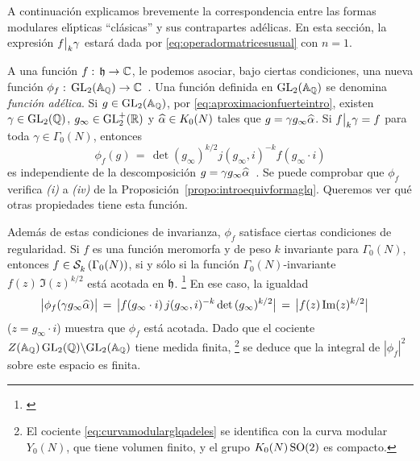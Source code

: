 A continuaci\'{o}n explicamos brevemente la correspondencia entre las formas
modulares el\'{\i}pticas ``cl\'{a}sicas'' y sus contrapartes ad\'{e}licas. En
esta secci\'{o}n, la expresi\'{o}n $f\big|_{k}{\gamma}$ estar\'{a}
dada por \eqref{eq:operadormatricesusual} con $n=1$.

A una funci\'{o}n $f:\,\mathfrak{h}\rightarrow\mathbb{C}$, le podemos asociar, bajo ciertas
condiciones, una nueva funci\'{o}n
\begin{math}
	\phi_{f}:\,\mathrm{GL}_{2}(\mathbb{A}_{\mathbb{Q}})\rightarrow\mathbb{C}
\end{math}~. Una funci\'{o}n definida en $\mathrm{GL}_{2}(\mathbb{A}_{\mathbb{Q}})$ se denomina
\emph{funci\'{o}n ad\'{e}lica}. Si $g\in\mathrm{GL}_{2}(\mathbb{A}_{\mathbb{Q}})$, por
\eqref{eq:aproximacionfuerteintro}, existen $\gamma\in\mathrm{GL}_{2}(\mathbb{Q})$,
$g_{\infty}\in\mathrm{GL}^{+}_{2}(\mathbb{R})$ y $\widehat{\alpha}\in K_{0}(N)$ tales que
$g=\gamma g_{\infty}\widehat{\alpha}$. Si $f\big|_{k}{\gamma}=f$ para
toda $\gamma\in\Gamma_{0}(N)$, entonces
\begin{equation}
	\label{eq:funcionadelicacorrespondientesobreq}
	\phi_{f}(g) \,=\, \det(g_{\infty})^{k/2}j(g_{\infty},i)^{-k}
		f(g_{\infty}\cdot i)
\end{equation}
%
es independiente de la descomposici\'{o}n
\begin{math}
	g=\gamma g_{\infty}\widehat{\alpha}
\end{math}~. Se puede comprobar que $\phi_f$ verifica \textit{(i)} a
\textit{(iv)} de la Proposici\'{o}n~\ref{propo:introequivformaglq}. Queremos
ver qu\'{e} otras propiedades tiene esta funci\'{o}n.

Adem\'{a}s de estas condiciones de invarianza, $\phi_{f}$ satisface ciertas
condiciones de regularidad. Si $f$ es una funci\'{o}n meromorfa y de peso $k$
invariante para $\Gamma_{0}(N)$, entonces $f\in\mathcal{S}^{}_{k}\left(\Gamma_{0}(N)\right)$, si y
s\'{o}lo si la funci\'{o}n $\Gamma_{0}(N)$-invariante $f(z)\,\Im(z)^{k/2}$
est\'{a} acotada en $\mathfrak{h}$.%
\footnote{
	\cite[Ch.~2, \S~1]{MiyakeModular}
}
En ese caso, la igualdad
\begin{align*}
	\big|\phi_{f}(\gamma g_{\infty}\widehat{\alpha})\big| & \,=\,
		\big|f(g_{\infty}\cdot i)\,j(g_{\infty},i)^{-k}\,
			\mathrm{det}\,(g_{\infty})^{k/2}\big|
		\,=\, \big|f(z)\,\mathrm{Im}(z)^{k/2}\big|
\end{align*}
%
($z=g_{\infty}\cdot i$) muestra que $\phi_{f}$ est\'{a} acotada.
Dado que el cociente
\begin{math}
	Z(\mathbb{A}_{\mathbb{Q}})\,\mathrm{GL}_{2}(\mathbb{Q})\backslash
		\mathrm{GL}_{2}(\mathbb{A}_{\mathbb{Q}})
\end{math}
tiene medida finita,%
\footnote{
	El cociente \eqref{eq:curvamodularglqadeles} se identifica con la curva
	modular $Y_{0}(N)$, que tiene volumen finito, y el grupo
	$K_{0}(N)\,\mathrm{SO}(2)$ es compacto.
}
se deduce que la integral de $|\phi_{f}|^{2}$ sobre este espacio es finita.


